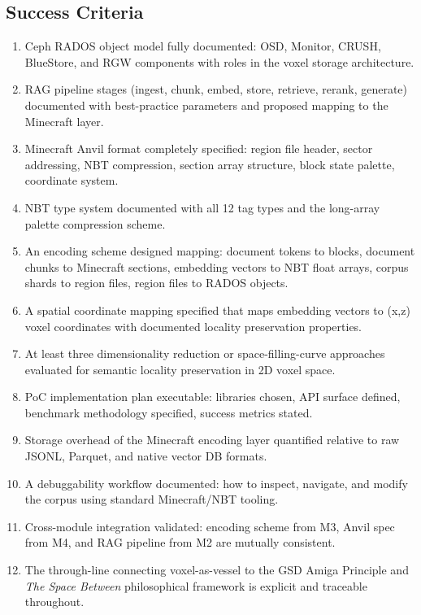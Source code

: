 \documentclass[11pt,letterpaper]{article}
\begin{document}
\subsection{Success Criteria}

\begin{enumerate}
  \item Ceph RADOS object model fully documented: OSD, Monitor, CRUSH, BlueStore, and RGW components with roles in the voxel storage architecture.
  \item RAG pipeline stages (ingest, chunk, embed, store, retrieve, rerank, generate) documented with best-practice parameters and proposed mapping to the Minecraft layer.
  \item Minecraft Anvil format completely specified: region file header, sector addressing, NBT compression, section array structure, block state palette, coordinate system.
  \item NBT type system documented with all 12 tag types and the long-array palette compression scheme.
  \item An encoding scheme designed mapping: document tokens to blocks, document chunks to Minecraft sections, embedding vectors to NBT float arrays, corpus shards to region files, region files to RADOS objects.
  \item A spatial coordinate mapping specified that maps embedding vectors to (x,z) voxel coordinates with documented locality preservation properties.
  \item At least three dimensionality reduction or space-filling-curve approaches evaluated for semantic locality preservation in 2D voxel space.
  \item PoC implementation plan executable: libraries chosen, API surface defined, benchmark methodology specified, success metrics stated.
  \item Storage overhead of the Minecraft encoding layer quantified relative to raw JSONL, Parquet, and native vector DB formats.
  \item A debuggability workflow documented: how to inspect, navigate, and modify the corpus using standard Minecraft/NBT tooling.
  \item Cross-module integration validated: encoding scheme from M3, Anvil spec from M4, and RAG pipeline from M2 are mutually consistent.
  \item The through-line connecting voxel-as-vessel to the GSD Amiga Principle and \textit{The Space Between} philosophical framework is explicit and traceable throughout.
\end{enumerate}
\end{document}
